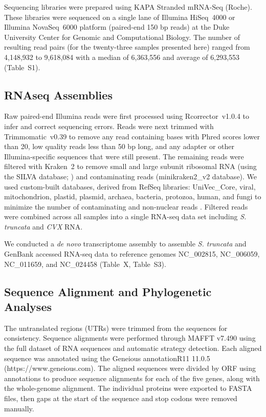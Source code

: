 \documentclass[fleqn,10pt,lineno]{wlpeerj}
\begin{document}
Sequencing libraries were prepared using KAPA Stranded mRNA-Seq (Roche).
These libraries were sequenced on a single lane of Illumina \mbox{HiSeq}~4000 or Illumina \mbox{NovaSeq}~6000 platform (paired-end 150 bp reads) at the Duke University Center for Genomic and Computational Biology.
The number of resulting read pairs (for the twenty-three samples presented here) ranged from 4,148,932 to 9,618,084 with a median of 6,363,556 and average of 6,293,553 (Table~S1).

\subsection*{RNAseq Assemblies}

Raw paired-end Illumina reads were first processed using \mbox{Rcorrector}~v1.0.4 \citep{song2015} to infer and correct sequencing errors.
Reads were next trimmed with \mbox{Trimmomatic}~v0.39 \citep{bolger2014} to remove any read containing bases with Phred scores lower than 20, low quality reads less than 50 bp long, and any adapter or other Illumina-specific sequences that were still present.
The remaining reads were filtered with \mbox{Kraken}~2 \citep{wood2019} to remove small and large subunit ribosomal RNA (using the SILVA database; \citealt{quast2013}) and contaminating reads (minikraken2\_v2 database).
We used custom-built databases, derived from RefSeq libraries: UniVec\_Core, viral, mitochondrion, plastid, plasmid, archaea, bacteria, protozoa, human, and fungi to minimize the number of contaminating and non-nuclear reads \citep{ramanauskas2021}.
Filtered reads were combined across all samples into a single RNA-seq data set including \textit{S. truncata} and \textit{CVX} RNA.

We conducted a \textit{de novo} transcriptome assembly to assemble \textit{S. truncata} and GenBank accessed RNA-seq data to reference genomes NC\_002815, NC\_006059, NC\_011659, and NC\_024458 (Table~X, Table~S3).


\subsection*{Sequence Alignment and Phylogenetic Analyses}

The untranslated regions (UTRs) were trimmed from the sequences for consistency.
Sequence alignments were performed through MAFFT v7.490 \citep{katoh_mafft_2002} using the full dataset of RNA sequences and automatic strategy detection. 
Each aligned sequence was annotated using the Geneious annotationR11 11.0.5 (https://www.geneious.com).
The aligned sequences were divided by ORF using annotations to produce sequence alignments for each of the five genes, along with the whole-genome alignment. 
The individual proteins were exported to FASTA files, then gaps at the start of the sequence and stop codons were removed manually. 
\end{document}

